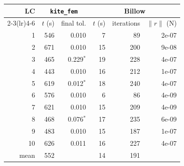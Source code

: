 \begin{tabular}{r rr rrr}
\toprule
LC & \multicolumn{2}{c}{\texttt{kite\_fem}} & \multicolumn{3}{c}{Billow} \\
\cmidrule(lr){2-3}\cmidrule(lr){4-6}
 & $t$ (s) & final tol. & $t$ (s) & iterations & $\|r\|$ (N) \\
\midrule
1 & 546 & 0.010 & 7 & 89 & 2e-07 \\
2 & 671 & 0.010 & 15 & 200 & 9e-08 \\
3 & 465 & 0.229$^{\ast}$ & 19 & 228 & 4e-07 \\
4 & 443 & 0.010 & 16 & 212 & 1e-07 \\
5 & 619 & 0.012$^{\ast}$ & 18 & 240 & 4e-07 \\
6 & 576 & 0.010 & 6 & 86 & 4e-09 \\
7 & 621 & 0.010 & 15 & 209 & 4e-09 \\
8 & 468 & 0.076$^{\ast}$ & 17 & 235 & 6e-09 \\
9 & 483 & 0.010 & 15 & 187 & 1e-07 \\
10 & 626 & 0.011 & 16 & 227 & 4e-07 \\
\midrule
mean & 552 & & 14 & 191 & \\
\bottomrule
\end{tabular}